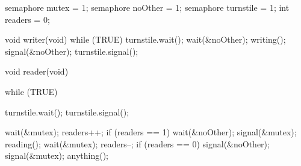 \documentclass[varwidth=28em,crop]{standalone}
\begin{document}
\begin{minipage}{.42\linewidth}
\vspace{1em}
\begin{ccode}
semaphore mutex = 1;
semaphore noOther = 1;
semaphore turnstile = 1;
int readers = 0;

void writer(void)
{
  while (TRUE) {
    turnstile.wait();
      wait(&noOther);
        writing();
      signal(&noOther);
    turnstile.signal();
  }
}  
\end{ccode}
\end{minipage}\qquad
\begin{minipage}{.48\linewidth}
\vspace{1em}
\begin{ccode}
void reader(void)
{
  while (TRUE) {
    turnstile.wait();
    turnstile.signal();

    wait(&mutex);
      readers++;
      if (readers == 1)
         wait(&noOther);
    signal(&mutex);
    reading();
    wait(&mutex);
      readers--;
      if (readers == 0)
        signal(&noOther);
    signal(&mutex);
    anything();
  }
}        
\end{ccode}  
\end{minipage}
\end{document}
